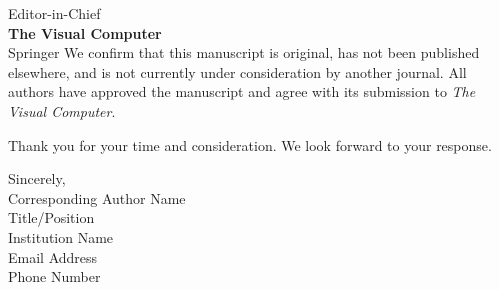 \documentclass[11pt,a4paper]{letter}
\begin{document}
\begin{letter}{
Editor-in-Chief\\
\textbf{The Visual Computer}\\
Springer
}
We confirm that this manuscript is original, has not been published elsewhere, and is not currently under consideration by another journal. All authors have approved the manuscript and agree with its submission to \textit{The Visual Computer}.

Thank you for your time and consideration. We look forward to your response.

\closing{Sincerely,\\
\vspace{1cm}
Corresponding Author Name\\
Title/Position\\
Institution Name\\
Email Address\\
Phone Number
}

\end{letter}
\end{document}
